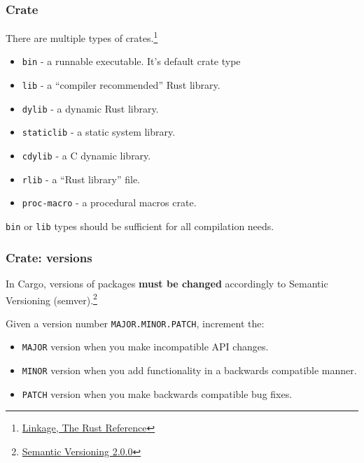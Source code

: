 \documentclass[aspectratio=1610,t]{beamer}
\begin{document}
\begin{frame}[fragile]
\frametitle{Crate}
There are multiple types of crates.\footnote{\href{https://doc.rust-lang.org/reference/linkage.html}{Linkage, The Rust Reference}}

\begin{itemize}
    \item \texttt{bin} - a runnable executable. It's default crate type
    \item \texttt{lib} - a ``compiler recommended'' Rust library.
    \item \texttt{dylib} - a dynamic Rust library.
    \item \texttt{staticlib} - a static system library.
    \item \texttt{cdylib} - a C dynamic library.
    \item \texttt{rlib} - a ``Rust library'' file.
    \item \texttt{proc-macro} - a procedural macros crate.
\end{itemize}

\texttt{bin} or \texttt{lib} types should be sufficient for all compilation needs.
\end{frame}


\begin{frame}[fragile]
\frametitle{Crate: versions}
In Cargo, versions of packages \textbf{must be changed} accordingly to Semantic Versioning (semver).\footnote{\href{https://semver.org}{Semantic Versioning 2.0.0}}

Given a version number \texttt{MAJOR.MINOR.PATCH}, increment the:

\begin{itemize}
    \item \texttt{MAJOR} version when you make incompatible API changes.
    \item \texttt{MINOR} version when you add functionality in a backwards compatible manner.
    \item \texttt{PATCH} version when you make backwards compatible bug fixes.
\end{itemize}
\end{frame}

\end{document}
